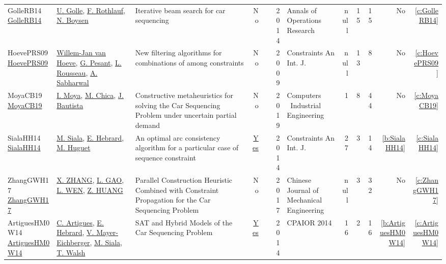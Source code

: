 {\begin{longtable}{>{\raggedright\arraybackslash}p{3cm}>{\raggedright\arraybackslash}p{6cm}>{\raggedright\arraybackslash}p{6.5cm}rrrp{2.5cm}rrrrr}
GolleRB14 \href{http://dx.doi.org/10.1007/s10479-014-1733-0}{GolleRB14} & \hyperref[auth:a61]{U. Golle}, \hyperref[auth:a62]{F. Rothlauf}, \hyperref[auth:a48]{N. Boysen} & Iterative beam search for car sequencing & No & \cite{GolleRB14} & 2014 & Annals of Operations Research & null & 15 & 15 & No & \ref{c:GolleRB14}\\
HoevePRS09 \href{http://dx.doi.org/10.1007/s10601-008-9067-7}{HoevePRS09} & \hyperref[auth:a39]{Willem-Jan van Hoeve}, \hyperref[auth:a40]{G. Pesant}, \hyperref[auth:a41]{L. Rousseau}, \hyperref[auth:a42]{A. Sabharwal} & New filtering algorithms for combinations of among constraints & No & \cite{HoevePRS09} & 2009 & Constraints An Int. J. & null & 13 & 8 & No & \ref{c:HoevePRS09}\\
MoyaCB19 \href{http://dx.doi.org/10.1016/j.cie.2019.106048}{MoyaCB19} & \hyperref[auth:a63]{I. Moya}, \hyperref[auth:a64]{M. Chica}, \hyperref[auth:a65]{J. Bautista} & Constructive metaheuristics for solving the Car Sequencing Problem under uncertain partial demand & No & \cite{MoyaCB19} & 2019 & Computers \  Industrial Engineering & 1 & 8 & 44 & No & \ref{c:MoyaCB19}\\
SialaHH14 \href{https://doi.org/10.1007/s10601-013-9150-6}{SialaHH14} & \hyperref[auth:a11]{M. Siala}, \hyperref[auth:a12]{E. Hebrard}, \hyperref[auth:a13]{M. Huguet} & An optimal arc consistency algorithm for a particular case of sequence constraint & \href{../cars/works/SialaHH14.pdf}{Yes} & \cite{SialaHH14} & 2014 & Constraints An Int. J. & 27 & 3 & 14 & \ref{b:SialaHH14} & \ref{c:SialaHH14}\\
ZhangGWH17 \href{http://dx.doi.org/10.1007/s10033-017-0083-7}{ZhangGWH17} & \hyperref[auth:a51]{X. ZHANG}, \hyperref[auth:a52]{L. GAO}, \hyperref[auth:a53]{L. WEN}, \hyperref[auth:a54]{Z. HUANG} & Parallel Construction Heuristic Combined with Constraint Propagation for the Car Sequencing Problem & No & \cite{ZhangGWH17} & 2017 & Chinese Journal of Mechanical Engineering & null & 3 & 32 & No & \ref{c:ZhangGWH17}\\
ArtiguesHM0W14 \href{https://doi.org/10.1007/978-3-319-07046-9_19}{ArtiguesHM0W14} & \hyperref[auth:a8]{C. Artigues}, \hyperref[auth:a12]{E. Hebrard}, \hyperref[auth:a35]{V. Mayer{-}Eichberger}, \hyperref[auth:a11]{M. Siala}, \hyperref[auth:a36]{T. Walsh} & {SAT} and Hybrid Models of the Car Sequencing Problem & \href{../cars/works/ArtiguesHM0W14.pdf}{Yes} & \cite{ArtiguesHM0W14} & 2014 & CPAIOR 2014 & 16 & 2 & 16 & \ref{b:ArtiguesHM0W14} & \ref{c:ArtiguesHM0W14}\\

\end{longtable}}
